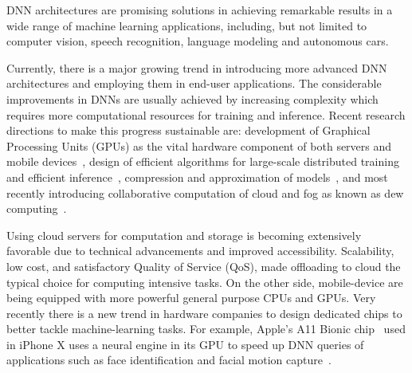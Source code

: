 


DNN architectures are promising solutions in achieving remarkable results in a wide range of machine learning applications, including, but not limited to computer vision, speech recognition, language modeling and autonomous cars. 

Currently, there is a major growing trend in introducing more advanced DNN architectures and employing them in end-user applications. The considerable improvements in DNNs are usually achieved by increasing complexity which requires more computational resources for training and inference. Recent research directions to make this progress sustainable are: development of Graphical Processing Units (GPUs) as the vital hardware component of both servers and mobile devices~\cite{GPU4NN}, design of efficient algorithms for large-scale distributed training~\cite{DistributedDNN} and efficient inference~\cite{SAMRAGH}, compression and approximation of models~\cite{efficientDNN}, and most recently introducing collaborative computation of cloud and fog as known as dew computing~\cite{DewComputing}. 

Using cloud servers for computation and storage is becoming extensively favorable due to technical advancements and improved accessibility. Scalability, low cost, and satisfactory Quality of Service (QoS), made offloading to cloud the typical choice for computing intensive tasks. On the other side, mobile-device are being equipped with more powerful general purpose CPUs and GPUs. Very recently there is a new trend in hardware companies to design dedicated chips to better tackle machine-learning tasks. For example, Apple's A11 Bionic chip~\cite{iPhoneX} used in iPhone X uses a neural engine in its GPU to speed up DNN queries of applications such as face identification and facial motion capture~\cite{animoji}. 

